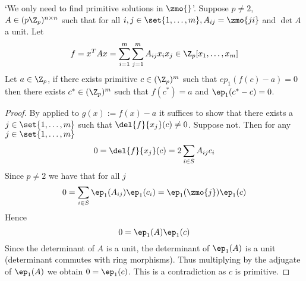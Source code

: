 \begin{cor}
    `We only need to find primitive solutions in $\zmo{ }$'.
    Suppose $p \ne 2$, 
    $A \in (p\Z_p)^{n \times n}$
    such that for all 
    $i,j \in \set{1,\dots,m}, A_{ij} = \zmo{ji}$
    and $\det A$ a unit. 
    Let
    \[
        f = x^T A x = 
        \sum_{i = 1}^m \sum_{j = 1}^m A_{ij} x_i x_j
        \in \Z_p[x_1,\dots,x_m]
    \]
    Let $a \in \Z_p$, 
    if there exists primitive $c \in (\Z_p)^m$
    such that $ep_1(f(c) - a) = 0$
    then there exists $c^* \in (\Z_p)^m$
    such that $f(c^*) = a$ and $\ep_1(c^* - c) = 0$.   
\end{cor}
\begin{proof}
    By  applied to $g(x) := f(x) - a$
    it suffices to show that
    there exists a $j \in \set{1,\dots, m}$ such that 
    $\del{f}{x_j}(c) \ne 0$.
    Suppose not.
    Then for any $j \in \set{1,\dots, m}$
    \[0 = \del{f}{x_j}(c) = 2 \sum_{i \in S} A_{ij} c_i\]
    Since $p \ne 2$ we have that for all $j$
    \[0 = \sum_{i \in S} \ep_1(A_{ij}) \ep_1(c_i) = 
    \ep_1 (\zmo{j}) \ep_1(c)\]
    Hence \[0 = \ep_1 (A) \ep_1 (c)\]
    Since the determinant of $A$ is a unit,
    the determinant of $\ep_1 (A)$ is a unit
    (determinant commutes with ring morphisms).
    Thus multiplying by the adjugate of $\ep_1 (A)$ 
    we obtain $0 = \ep_1(c)$.
    This is a contradiction as $c$ is primitive.
\end{proof}

